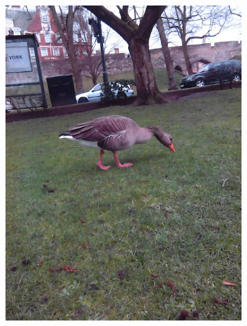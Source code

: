 \documentclass{l4proj}
\begin{document}
\begin{figure}[ht]
\begin{subfigure}[h!]{0.18\textwidth}
    \includegraphics[width=\textwidth, trim={0cm 2.5cm 0cm 2.5cm}, clip]{images/dataset/goose/rgb.png}

\end{subfigure}
\end{figure}
\end{document}
